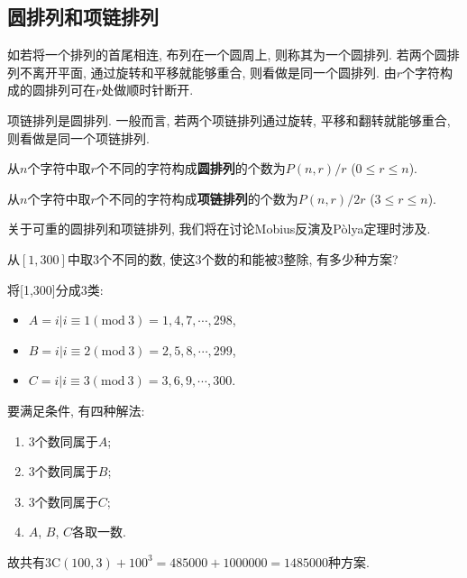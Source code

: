     \subsection{圆排列和项链排列}

        \begin{definition}[圆排列]
            如若将一个排列的首尾相连, 布列在一个圆周上, 则称其为一个\textsf{圆排列}. 若两个圆排列不离开平面, 通过旋转和平移就能够重合, 则看做是同一个圆排列. 由$r$个字符构成的圆排列可在$r$处做顺时针断开.
        \end{definition}

        \begin{definition}[项链排列]
            \textsf{项链排列}是圆排列. 一般而言, 若两个项链排列通过旋转, 平移和翻转就能够重合, 则看做是同一个项链排列. 
        \end{definition}

        \begin{theorem}\rm
            从$n$个字符中取$r$个不同的字符构成\textbf{圆排列}的个数为$P(n,r)/r$ ($0\leqslant r\leqslant n$).

            从$n$个字符中取$r$个不同的字符构成\textbf{项链排列}的个数为$P(n,r)/2r$ ($3\leqslant r\leqslant n$).
        \end{theorem}

        关于可重的圆排列和项链排列, 我们将在讨论Mobius反演及P\`olya定理时涉及.

        \begin{example}
            从$[1,300]$中取3个不同的数, 使这3个数的和能被3整除, 有多少种方案? 

            \begin{sol}
                将[1,300]分成3类: 
                \begin{itemize}
                    \item $A={i|i\equiv1(\mathrm{mod\ }3)}={1,4,7,\cdots,298}$,
                    \item $B={i|i\equiv2(\mathrm{mod\ }3)}={2,5,8,\cdots,299}$,
                    \item $C={i|i\equiv3(\mathrm{mod\ }3)}={3,6,9,\cdots,300}$.
                \end{itemize}
                要满足条件, 有四种解法: 
                \begin{enumerate}
                    \item 3个数同属于$A$;
                    \item 3个数同属于$B$;
                    \item 3个数同属于$C$;
                    \item $A$, $B$, $C$各取一数.
                \end{enumerate}
                故共有$3\mathrm{C}(100,3)+100^3=485000+1000000=1485000$种方案.
            \end{sol}
        \end{example}

